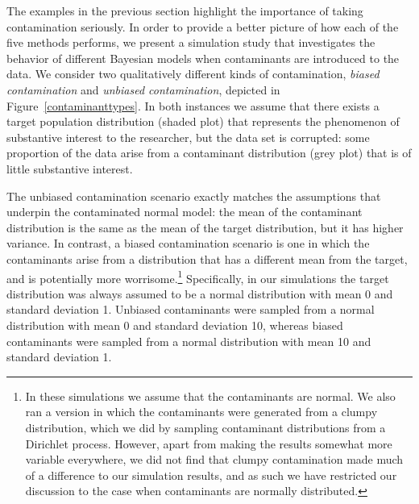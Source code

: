 \documentclass[doc]{apa6}
\begin{document}
{The examples in the previous section highlight the importance of taking contamination seriously. In order to provide a better picture of how each of the     five   methods performs, we present a simulation study that investigates the behavior of different Bayesian models when contaminants are introduced to the data. We consider two qualitatively different kinds of contamination, {\it biased contamination} and {\it unbiased contamination}, depicted in Figure~\ref{contaminanttypes}. In both instances we assume that there exists a target population distribution (shaded plot) that represents the phenomenon of substantive interest to the researcher, but the data set is corrupted: some proportion of the data arise from a contaminant distribution (grey plot) that is of little substantive interest.

The unbiased contamination scenario exactly matches the assumptions that underpin the contaminated normal model: the mean of the contaminant distribution is the same as the mean of the target distribution, but it has higher variance. In contrast, a biased contamination scenario is one in which the contaminants arise from a distribution that has a different mean from the target, and is potentially more worrisome.\footnote{In these simulations we assume that the contaminants are normal. We also ran a version in which the contaminants were generated from a clumpy distribution, which we did by sampling contaminant distributions from a Dirichlet process. However, apart from making the results somewhat more variable everywhere, we did not find that clumpy contamination made much of a difference to our simulation results, and as such we have restricted our discussion to the case when contaminants are normally distributed.} Specifically, in our simulations the target distribution was always assumed to be a normal distribution with mean 0 and standard deviation 1. Unbiased contaminants were sampled from a normal distribution with mean 0 and standard deviation 10, whereas biased contaminants were sampled from a normal distribution with mean 10 and standard deviation 1.

}
\end{document}

